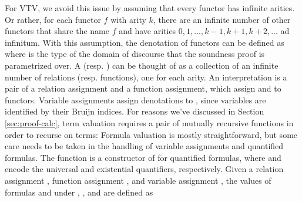 \documentclass{lipics-v2021}
\begin{document}
For VTV, we avoid this issue by assuming that every functor has infinite arities.
Or rather, for each functor $f$ with arity $k$, there are an infinite number 
of other functors that share the name $f$ and have arities $0, 1, ..., k-1, k+1, k+2, ...$ 
ad infinitum. With this assumption, the denotation of functors can be defined as 
where  is the type of the domain of discourse that the 
soundness proof is parametrized over.
A  (resp. ) can be thought of as a 
collection of an infinite number of relations (resp. functions), one for 
each arity. An interpretation is a pair of a relation assignment and a 
function assignment, which assign  and  
to functors.
Variable assignments assign denotations to , since variables are 
identified by their Bruijn indices.
For reasons we've discussed in Section \ref{sec:proof-calc}, term valuation 
requires a pair of mutually recursive functions in order to recurse on terms:
Formula valuation is mostly straightforward, but some care needs to be taken 
in the handling of variable assignments and quantified formulas. 
The function  \AgdaSymbol{:}      
is a constructor of  for quantified formulas, where 
  and
  encode the universal and existential quantifiers, respectively.
Given a relation assignment ,
function assignment   , and
variable assignment   ,
the values of formulas 
   and
   under
, , and  are defined as
\end{document}
